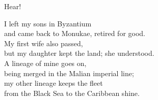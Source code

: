 \begin{lyrics}
Hear!

I left my sons in Byzantium\\
and came back to Monukae, retired for good.\\
My first wife also passed,\\
but my daughter kept the land; she understood.\\
A lineage of mine goes on,\\
being merged in the Malian imperial line;\\
my other lineage keeps the fleet\\
from the Black Sea to the Caribbean shine.
\end{lyrics}

